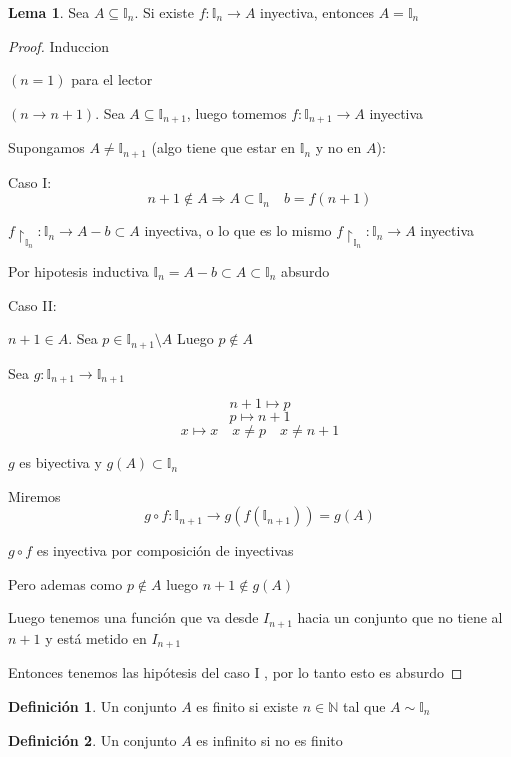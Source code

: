 \documentclass[12pt]{article}
\newcommand{\I}{\mathbb{I}}
\newcommand{\N}{\mathbb{N}}
\newcommand{\Ra}{\Rightarrow}
\newcommand{\ra}{\rightarrow}
\theoremstyle{definition}
\newtheorem{definition}{Definición}[section]
\newtheorem{lemma}[theorem]{Lema}
\begin{document}
\begin{lemma}
  Sea $A \subseteq \I_{n}$. Si existe $f: \I_{n} \ra A$ inyectiva, entonces $A = \I_{n}$

  \begin{proof}
    Induccion

  $(n=1)$ para el lector

  $(n \ra n + 1) $. Sea $A \subseteq \I_{n+1}$, luego tomemos $f: \I_{n+1} \ra A$ inyectiva

  Supongamos $A \neq \I_{n+1}$ (algo tiene que estar en $\I_{n}$ y no en $A$):

    Caso I: $$n+1 \notin A \Ra A \subset \I_{n} \quad b = f(n+1)$$

    \begin{center}$f\restriction_{\I_{n}} : \I_{n} \ra A - {b} \subset A$ inyectiva, o lo que es lo mismo $f \restriction_{\I_{n}}:\I_{n} \ra A$ inyectiva \end{center}

    Por hipotesis inductiva $\I_{n} = A - {b} \subset A \subset \I_{n}$ absurdo

    Caso II: \begin{center} $n+1 \in A$. Sea $p \in \I_{n+1} \setminus A $ Luego $p \notin A$ \end{center}

    Sea $g: \I_{n+1} \ra \I_{n+1}$
    
   $$n+1 \mapsto p$$
    $$p \mapsto n+1$$
  $$x \mapsto x \quad x \neq p \quad x \neq n+1$$

  $g$ es biyectiva  y $g(A) \subset \I_{n}$

  Miremos $$g \circ f: \I_{n+1} \ra g(f(\I_{n+1})) = g(A)  $$

  $g \circ f$ es inyectiva por composición de inyectivas

  Pero ademas como $ p \notin A$ luego $n + 1 \notin g(A) $

  Luego tenemos una función que va desde $I_{n+1}$ hacia un conjunto que no tiene al $n + 1$ y está metido en $I_{n+1}$

  Entonces tenemos las hipótesis del caso I , por lo tanto esto es absurdo

  \end{proof}

  \begin{definition}
    Un conjunto $A$ es finito si existe $n \in \N $ tal que $A \sim \I_{n}$
  \end{definition}

  \begin{definition}
    Un conjunto $A$ es infinito si no es finito
  \end{definition}


\end{lemma}
\end{document}

